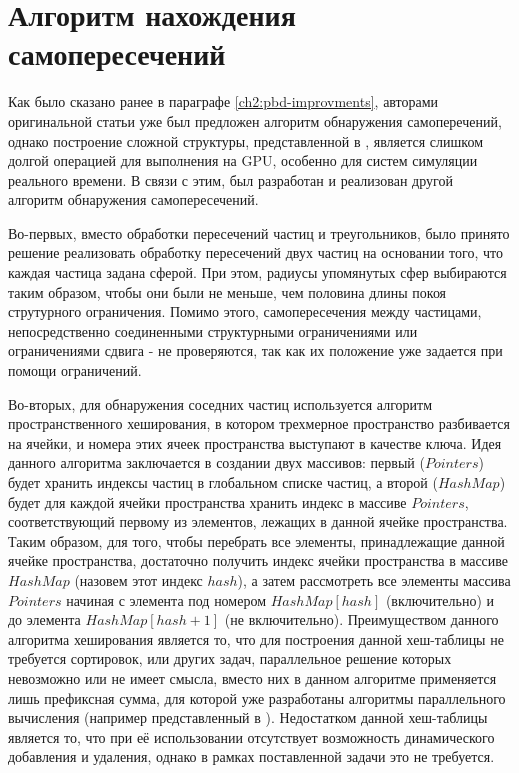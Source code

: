 \section{Алгоритм нахождения самопересечений} \label{ch3:selfCollision}
	Как было сказано ранее в параграфе \ref{ch2:pbd-improvments}, авторами оригинальной статьи уже был предложен алгоритм обнаружения самоперечений, однако построение сложной структуры, представленной в \cite{teschner2003optimized}, является слишком долгой операцией для выполнения на GPU, особенно для систем симуляции реального времени. В связи с этим, был разработан и реализован другой алгоритм обнаружения самопересечений.
	
	Во-первых, вместо обработки пересечений частиц и треугольников, было принято решение реализовать обработку пересечений двух частиц на основании того, что каждая частица задана сферой. При этом, радиусы упомянутых сфер выбираются таким образом, чтобы они были не меньше, чем половина длины покоя струтурного ограничения. Помимо этого, самопересечения между частицами, непосредственно соединенными структурными ограничениями или ограничениями сдвига - не проверяются, так как их положение уже задается при помощи ограничений.
	
	Во-вторых, для обнаружения соседних частиц используется алгоритм пространственного хеширования\cite{hashing2023}, в котором трехмерное пространство разбивается на ячейки, и номера этих ячеек пространства выступают в качестве ключа. Идея данного алгоритма заключается в создании двух массивов: первый ($Pointers$) будет хранить индексы частиц в глобальном списке частиц, а второй ($HashMap$) будет для каждой ячейки пространства хранить индекс в массиве $Pointers$, соответствующий первому из элементов, лежащих в данной ячейке пространства. Таким образом, для того, чтобы перебрать все элементы, принадлежащие данной ячейке пространства, достаточно получить индекс ячейки пространства в массиве $HashMap$ (назовем этот индекс $hash$), а затем рассмотреть все элементы массива $Pointers$ начиная с элемента под номером $HashMap[hash]$ (включительно) и до элемента $HashMap[hash + 1]$ (не включительно). Преимуществом данного алгоритма хеширования является то, что для построения данной хеш-таблицы не требуется сортировок, или других задач, параллельное решение которых невозможно или не имеет смысла, вместо них в данном алгоритме применяется лишь префиксная сумма, для которой уже разработаны алгоритмы параллельного вычисления (например представленный в \cite{hillis1986data}). Недостатком данной хеш-таблицы является то, что при её использовании отсутствует возможность динамического добавления и удаления, однако в рамках поставленной задачи это не требуется.
	

